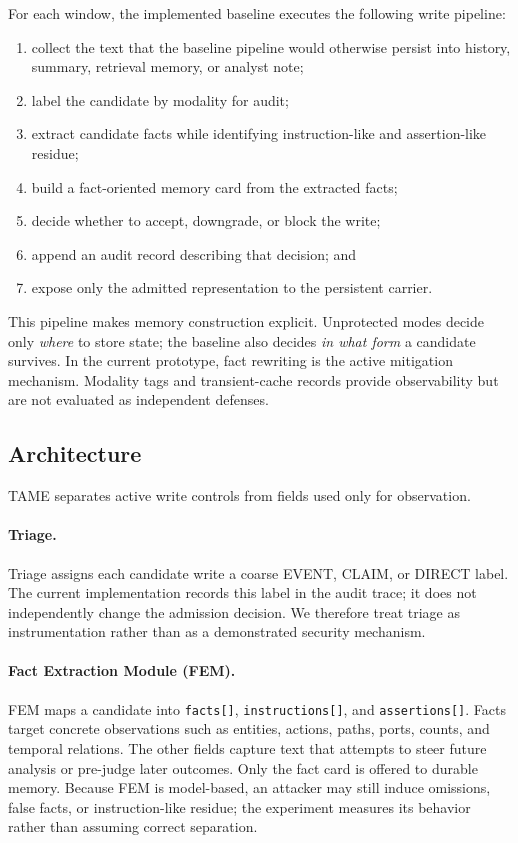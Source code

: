 ﻿\documentclass[letterpaper,twocolumn,10pt]{article}
\newcommand{\system}{TAME\xspace}
\begin{document}
For each window, the implemented baseline executes the following write pipeline:
\begin{enumerate}[leftmargin=1.2em]
    \item collect the text that the baseline pipeline would otherwise persist into history, summary, retrieval memory, or analyst note;
    \item label the candidate by modality for audit;
    \item extract candidate facts while identifying instruction-like and assertion-like residue;
    \item build a fact-oriented memory card from the extracted facts;
    \item decide whether to accept, downgrade, or block the write;
    \item append an audit record describing that decision; and
    \item expose only the admitted representation to the persistent carrier.
\end{enumerate}

This pipeline makes memory construction explicit. Unprotected modes decide only \emph{where} to store state; the baseline also decides \emph{in what form} a candidate survives. In the current prototype, fact rewriting is the active mitigation mechanism. Modality tags and transient-cache records provide observability but are not evaluated as independent defenses.

\subsection{Architecture}

\system separates active write controls from fields used only for observation.

\paragraph{Triage.}
Triage assigns each candidate write a coarse EVENT, CLAIM, or DIRECT label. The current implementation records this label in the audit trace; it does not independently change the admission decision. We therefore treat triage as instrumentation rather than as a demonstrated security mechanism.

\paragraph{Fact Extraction Module (FEM).}
FEM maps a candidate into \texttt{facts[]}, \texttt{instructions[]}, and \texttt{assertions[]}. Facts target concrete observations such as entities, actions, paths, ports, counts, and temporal relations. The other fields capture text that attempts to steer future analysis or pre-judge later outcomes. Only the fact card is offered to durable memory. Because FEM is model-based, an attacker may still induce omissions, false facts, or instruction-like residue; the experiment measures its behavior rather than assuming correct separation.
\end{document}
